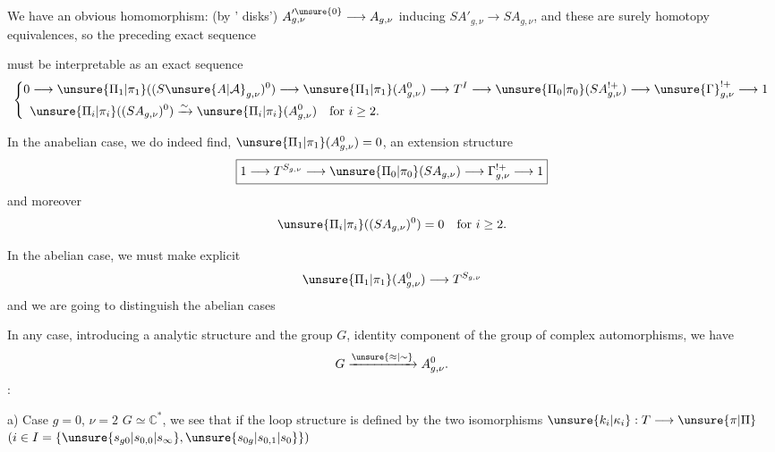 We have an obvious homomorphism: (by ' disks')
$A_{g,\nu}^{\prime\unsure{0}}\longrightarrow A_{g,\nu}$ inducing
$SA'_{g,\nu}\longrightarrow SA_{g,\nu}$,
 and these are surely homotopy equivalences, so
 the preceding exact sequence



must be interpretable as an exact sequence
\[
\left\{\begin{aligned}
0&\longrightarrow\unsure{\Pi_1|\pi_1}((S\unsure{A|\mathcal A}_{g,\nu})^0)
\longrightarrow\unsure{\Pi_1|\pi_1}(A_{g,\nu}^0)
\longrightarrow T^I\longrightarrow\unsure{\Pi_0|\pi_0}(SA_{g,\nu}^{!+})
\longrightarrow\unsure{\Gamma}_{g,\nu}^{!+}\longrightarrow1\\
&\unsure{\Pi_i|\pi_i}((SA_{g,\nu})^0)\xrightarrow{\sim}
\unsure{\Pi_i|\pi_i}(A_{g,\nu}^0)\quad\text{for }i\geq2.
\end{aligned}\right.
\]

In the anabelian case, we do indeed find, 
$\unsure{\Pi_1|\pi_1}(A_{g,\nu}^0)=0$, an extension structure
\[
\boxed{1\longrightarrow T^{S_{g,\nu}}\longrightarrow
\unsure{\Pi_0|\pi_0}(SA_{g,\nu})\longrightarrow\Gamma_{g,\nu}^{!+}\longrightarrow1}
\]
and moreover
\[
\unsure{\Pi_i|\pi_i}((SA_{g,\nu})^0)=0\quad\text{for }i\geq2.
\]

In the abelian case, we must make explicit
\[
\unsure{\Pi_1|\pi_1}(A_{g,\nu}^0)\longrightarrow T^{S_{g,\nu}}
\]
and we are going to distinguish the  abelian cases

In any case, introducing a  analytic structure and the group $G$, identity component of the group of complex automorphisms, we have
\[
G\xrightarrow{\unsure{\approx|\sim}}A_{g,\nu}^0.
\]
 :

a) Case $g=0$, $\nu=2$ 
$G\simeq\mathbb C^*$, 
we see that if the loop structure  is defined by the two isomorphisms
$\unsure{k_i|\kappa_i}:T\longrightarrow\unsure{\pi|\Pi}$
$(i\in I=\{\unsure{s_{g0}|s_{0,0}|s_\infty},\unsure{s_{0g}|s_{0,1}|s_0}\})$

